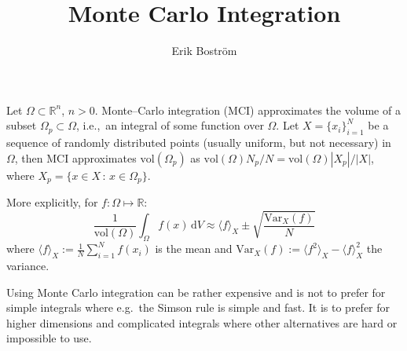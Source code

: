 \documentclass{amsart}
\title{Monte Carlo Integration}
\author{Erik Boström}
\begin{document}
\maketitle
Let $\Omega\subset \mathbb{R}^n$, $n>0$. Monte--Carlo integration (MCI) approximates the volume of a subset $\Omega_p\subset \Omega$, i.e.,\ an integral of some function over $\Omega$. Let $X=\{x_i\}_{i=1}^N$ be a sequence of randomly distributed points (usually uniform, but not necessary) in $\Omega$, then MCI approximates $\text{vol}(\Omega_p)$ as $\text{vol}(\Omega)N_p/N=\text{vol}(\Omega)|X_p|/|X|$, where $X_p=\{x\in X\,:\,x\in \Omega_p\}$. 

More explicitly, for $f:\Omega\mapsto \mathbb{R}$:
$$\frac{1}{\text{vol}(\Omega)}\int_{\Omega}f(x)\,\mathrm{d}V\approx \langle f \rangle_X\pm \sqrt{\frac{\text{Var}_X(f)}{N}}$$
where $\langle f \rangle_X:=\frac{1}{N}\sum_{i=1}^Nf(x_i)$ is the mean and $\text{Var}_X(f):=\langle f^2\rangle_X - \langle f\rangle_X^2$ the variance. 

Using Monte Carlo integration can be rather expensive and is not to prefer for simple integrals where e.g.\ the Simson rule is simple and fast. It is to prefer for higher dimensions and complicated integrals where other alternatives are hard or impossible to use. 
\end{document}
